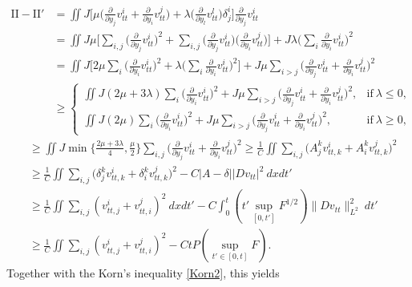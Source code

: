 \documentclass[12pt,a4paper]{amsart}
\numberwithin{equation}{section}
\theoremstyle{plain}
\theoremstyle{definition}
\begin{document}
\begin{align*}
\mathrm{II}-\mathrm{II}'& =\iint J \bigg[ \mu \Big( \frac{\partial}{\partial y_j}v_{tt}^i+\frac{\partial}{\partial y_i}v_{tt}^j   \Big) +\lambda \Big( \frac{\partial}{\partial y_l}v_{tt}^l \Big) \delta^i_j \bigg] \frac{\partial}{\partial y_j}v_{tt}^i\\
&=\iint J\mu \bigg[ \sum\limits_{i,j} \Big( \frac{\partial}{\partial y_j}v_{tt}^i   \Big)^2 +\sum\limits_{i,j} \Big( \frac{\partial}{\partial y_j}v_{tt}^i   \Big)\Big( \frac{\partial}{\partial y_i}v_{tt}^j   \Big)\bigg] +J\lambda \Big( \sum\limits_{i} \frac{\partial}{\partial y_i}v_{tt}^i \Big)^2 \\
&=\iint J \bigg[2\mu \sum\limits_{i} \Big( \frac{\partial}{\partial y_i}v_{tt}^i   \Big)^2 +\lambda \Big(\sum\limits_{i} \frac{\partial}{\partial y_i}v_{tt}^i   \Big)^2\bigg] +J \mu \sum\limits_{i>j}\Big(  \frac{\partial}{\partial y_j}v_{tt}^i +\frac{\partial}{\partial y_i}v_{tt}^j \Big)^2\\
&\geq\begin{cases}
\iint J (2\mu+3\lambda) \sum\limits_{i} \Big( \frac{\partial}{\partial y_i}v_{tt}^i   \Big)^2 +J \mu \sum\limits_{i>j}\Big(  \frac{\partial}{\partial y_j}v_{tt}^i +\frac{\partial}{\partial y_i}v_{tt}^j \Big)^2, &\text{if}~ \lambda\leq 0,\\
\iint J (2\mu) \sum\limits_{i} \Big( \frac{\partial}{\partial y_i}v_{tt}^i   \Big)^2 +J \mu \sum\limits_{i>j}\Big(  \frac{\partial}{\partial y_j}v_{tt}^i +\frac{\partial}{\partial y_i}v_{tt}^j \Big)^2, &\text{if}~ \lambda\geq 0,
\end{cases}
\end{align*}
\begin{align*}
&\geq \iint J \min\{ \frac{2\mu+3\lambda}{4},\frac{\mu}{2}\}\sum\limits_{i,j}\Big(  \frac{\partial}{\partial y_j}v_{tt}^i +\frac{\partial}{\partial y_i}v_{tt}^j \Big)^2 
\geq \frac{1}{C}\iint  \sum\limits_{i,j}\Big(A^k_j  v_{tt,k}^i+A^k_i  v_{tt,k}^j\Big)^2\\
&\geq\frac{1}{C}\iint  \sum\limits_{i,j}\Big(\delta^k_j  v_{tt,k}^i+\delta^k_i  v_{tt,k}^j\Big)^2-C|A-\delta| |Dv_{tt}|^2 \ dxdt'\\
&\geq\frac{1}{C}\iint\sum\limits_{i,j}( v_{tt,j}^i+ v_{tt,i}^j)^2 \ dxdt'
-C \int_{0}^{t}  (t' \sup\limits_{[0,t']}F^{1/2} ) \| Dv_{tt}\|_{L^2}^2\ dt'\\
&\geq\frac{1}{C}\iint\sum\limits_{i,j}( v_{tt,j}^i+ v_{tt,i}^j)^2-CtP(\sup\limits_{t'\in[0,t]}F).
\end{align*}
Together with the Korn's inequality \eqref{Korn2}, this yields
\end{document}
